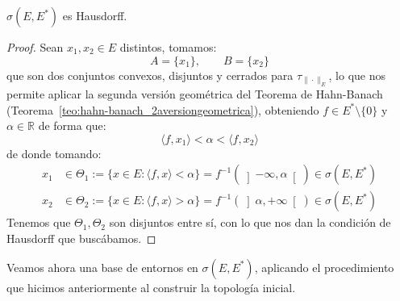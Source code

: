 \begin{prop}
    $\sigma(E,E^\ast)$ es Hausdorff.
    \begin{proof}
        Sean $x_1,x_2\in E$ distintos, tomamos:
        \begin{equation*}
            A = \{x_1\}, \qquad B = \{x_2\}
        \end{equation*}
        que son dos conjuntos convexos, disjuntos y cerrados para $\tau_{\|\cdot \|_E}$, lo que nos permite aplicar la segunda versión geométrica del Teorema de Hahn-Banach (Teorema~\ref{teo:hahn-banach_2aversiongeometrica}), obteniendo $f\in E^\ast\setminus\{0\}$ y $\alpha\in \mathbb{R}$ de forma que:
        \begin{equation*}
            \langle f,x_1 \rangle  < \alpha < \langle f,x_2 \rangle 
        \end{equation*}
        de donde tomando:
        \begin{align*}
            x_1 &\in \Theta_1 := \{x\in E : \langle f,x \rangle <\alpha\} = f^{-1}(\left]-\infty,\alpha\right[) \in \sigma(E,E^\ast) \\
            x_2 &\in \Theta_2 := \{x\in E : \langle f,x \rangle >\alpha\} = f^{-1}(\left]\alpha,+\infty\right[) \in \sigma(E,E^\ast) 
        \end{align*}
        Tenemos que $\Theta_1,\Theta_2$ son disjuntos entre sí, con lo que nos dan la condición de Hausdorff que buscábamos.
    \end{proof}
\end{prop}

\noindent
Veamos ahora una base de entornos en $\sigma(E,E^\ast)$, aplicando el procedimiento que hicimos anteriormente al construir la topología inicial.

